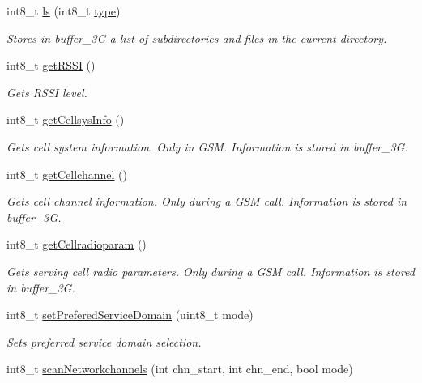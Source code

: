 \begin{DoxyCompactItemize}
int8\+\_\+t \hyperlink{class_wasp3_g_a1c153da232388cc14b50e5f02213e77c}{ls} (int8\+\_\+t \hyperlink{_sd_fat_structs_8h_a1d127017fb298b889f4ba24752d08b8e}{type})
\begin{DoxyCompactList}\small\item\em Stores in \textquotesingle{}buffer\+\_\+3G\textquotesingle{} a list of subdirectories and files in the current directory. \end{DoxyCompactList}\item 
int8\+\_\+t \hyperlink{class_wasp3_g_a587f25964e474e345c2a4b3027974c99}{get\+R\+S\+SI} ()
\begin{DoxyCompactList}\small\item\em Gets R\+S\+SI level. \end{DoxyCompactList}\item 
int8\+\_\+t \hyperlink{class_wasp3_g_a89b01ed664d66bf4cbc43a7f07fbcaef}{get\+Cellsys\+Info} ()
\begin{DoxyCompactList}\small\item\em Gets cell system information. Only in G\+SM. Information is stored in \textquotesingle{}buffer\+\_\+3G\textquotesingle{}. \end{DoxyCompactList}\item 
int8\+\_\+t \hyperlink{class_wasp3_g_ad6b25d2def3224de3f6f293fb43b8173}{get\+Cellchannel} ()
\begin{DoxyCompactList}\small\item\em Gets cell channel information. Only during a G\+SM call. Information is stored in \textquotesingle{}buffer\+\_\+3G\textquotesingle{}. \end{DoxyCompactList}\item 
int8\+\_\+t \hyperlink{class_wasp3_g_a10ef9ce122bcb1c936e6dbfd85cbd050}{get\+Cellradioparam} ()
\begin{DoxyCompactList}\small\item\em Gets serving cell radio parameters. Only during a G\+SM call. Information is stored in \textquotesingle{}buffer\+\_\+3G\textquotesingle{}. \end{DoxyCompactList}\item 
int8\+\_\+t \hyperlink{class_wasp3_g_a5dbee8c3d150ede7361ef7d5325103cb}{set\+Prefered\+Service\+Domain} (uint8\+\_\+t mode)
\begin{DoxyCompactList}\small\item\em Sets preferred service domain selection. \end{DoxyCompactList}\item 
int8\+\_\+t \hyperlink{class_wasp3_g_a970c5dfc985a6c3bdbdbac799884f30b}{scan\+Networkchannels} (int chn\+\_\+start, int chn\+\_\+end, bool mode)

\end{DoxyCompactItemize}
